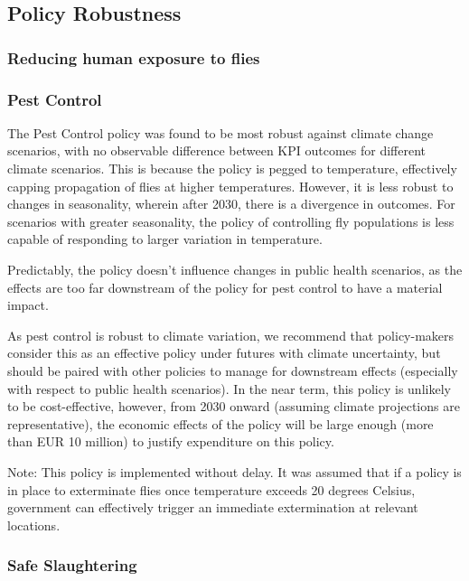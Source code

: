 \newpage
\subsection{Policy Robustness}
\subsubsection{Reducing human exposure to flies}



\subsubsection{Pest Control}
The Pest Control policy was found to be most robust against climate change scenarios, with no observable difference between KPI outcomes for different climate scenarios. This is because the policy is pegged to temperature, effectively capping propagation of flies at higher temperatures. However, it is less robust to changes in seasonality, wherein after 2030, there is a divergence in outcomes. For scenarios with greater seasonality, the policy of controlling fly populations is less capable of responding to larger variation in temperature.


Predictably, the policy doesn't influence changes in public health scenarios, as the effects are too far downstream of the policy for pest control to have a material impact.

As pest control is robust to climate variation, we recommend that policy-makers consider this as an effective policy under futures with climate uncertainty, but should be paired with other policies to manage for downstream effects (especially with respect to public health scenarios). In the near term, this policy is unlikely to be cost-effective, however, from 2030 onward (assuming climate projections are representative), the economic effects of the policy will be large enough (more than EUR 10 million) to justify expenditure on this policy.

Note: This policy is implemented without delay. It was assumed that if a policy is in place to exterminate flies once temperature exceeds 20 degrees Celsius, government can effectively trigger an immediate extermination at relevant locations.

\subsubsection{Safe Slaughtering}



